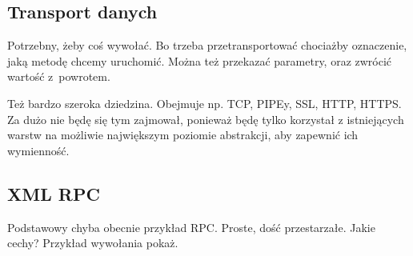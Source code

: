 %
%
%
%

\subsection{Transport danych}
Potrzebny, żeby coś wywołać. Bo trzeba przetransportować chociażby oznaczenie, jaką metodę chcemy uruchomić. Można też przekazać parametry, oraz zwrócić wartość z~powrotem.

Też bardzo szeroka dziedzina. Obejmuje np. TCP, PIPEy, SSL, HTTP, HTTPS\@. Za dużo nie będę się tym zajmował, ponieważ będę tylko korzystał z istniejących warstw na możliwie największym poziomie abstrakcji, aby zapewnić ich wymienność.
%
%
%
%

\subsection{XML RPC}
Podstawowy chyba obecnie przykład RPC\@. Proste, dość przestarzałe. Jakie cechy? Przykład wywołania pokaż.

